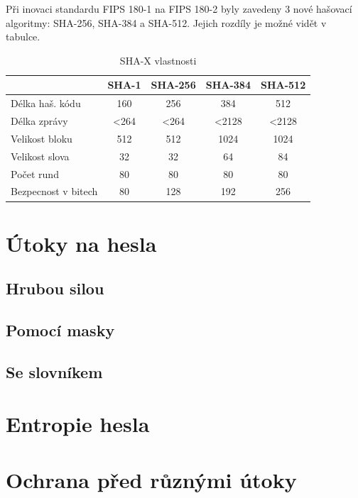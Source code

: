 
Při inovaci standardu FIPS 180-1 na FIPS 180-2  byly zavedeny 3 nové hašovací algoritmy: SHA-256, SHA-384 a SHA-512. Jejich rozdíly je možné vidět v tabulce. 


\begin{table}[!ht]
  \begin{center}
	\caption{SHA-X vlastnosti}
    \label{tab:SHA-X}
    \begin{tabular}{|l|c|c|c|c|} 
    	  \hline
      \textbf{} & \textbf{SHA-1} & \textbf{SHA-256} & \textbf{SHA-384} & \textbf{SHA-512}\\
      \hline
	  Délka haš. kódu 		& 160  & 256  & 384   & 512\\
	  Délka zprávy 			& <264 & <264 & <2128 & <2128\\
	  Velikost bloku 		& 512  & 512  & 1024  & 1024\\
	  Velikost slova 		& 32   & 32   & 64    & 84\\
	  Počet rund 			& 80   & 80   & 80    & 80\\
	  Bezpecnost v bitech 	& 80   & 128  & 192   & 256\\
      \hline
    \end{tabular}
  \end{center}
\end{table}

\section{Útoky na hesla}



\subsection{Hrubou silou}

\subsection{Pomocí masky}

\subsection{Se slovníkem}

\section{Entropie hesla}

\section{Ochrana před různými útoky}


